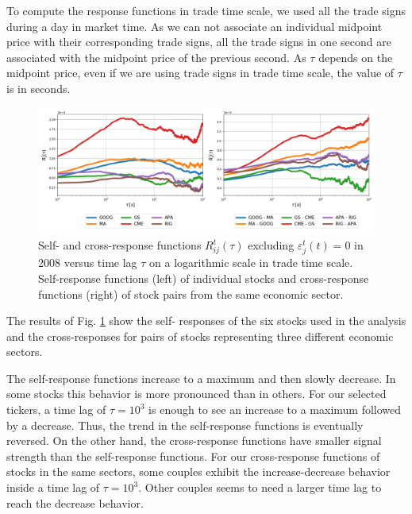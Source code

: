 To compute the response functions in trade time scale, we used all the trade
signs during a day in market time. As we can not associate an individual
midpoint price with their corresponding trade signs, all the trade signs in one
second are associated with the midpoint price of the previous second.
As $\tau$ depends on the midpoint price, even if we are using trade signs in
trade time scale, the value of $\tau$ is in seconds.

\begin{figure}[htbp]
    \centering
    \includegraphics[width=\textwidth]
    {figures/03_responses_trade_scale_2008.png}
    \caption{Self- and cross-response functions
             $R^{t}_{ij}\left(\tau\right)$ excluding
             $\varepsilon^{t}_{j}\left(t\right) = 0$ in 2008 versus time
             lag $\tau$ on a logarithmic scale in trade time scale.
             Self-response functions (left) of individual stocks and
             cross-response functions (right) of stock pairs from the same
             economic sector.}
    \label{fig:response_function_trade_scale}
\end{figure}

The results of Fig. \ref{fig:response_function_trade_scale} show the self-
responses of the six stocks used in the analysis and the cross-responses for
pairs of stocks representing three different economic sectors.

The self-response functions increase to a maximum and then slowly decrease. In
some stocks this behavior is more pronounced than in others. For our selected
tickers, a time lag of $\tau = 10^{3}$ is enough to see an increase to a maximum
followed by a decrease. Thus, the trend in the self-response functions is
eventually reversed.
On the other hand, the cross-response functions have smaller signal strength
than the self-response functions. For our cross-response functions of stocks in
the same sectors, some couples exhibit the increase-decrease behavior inside a
time lag of $\tau = 10^{3}$. Other couples seems to need a larger time lag to
reach the decrease behavior.

